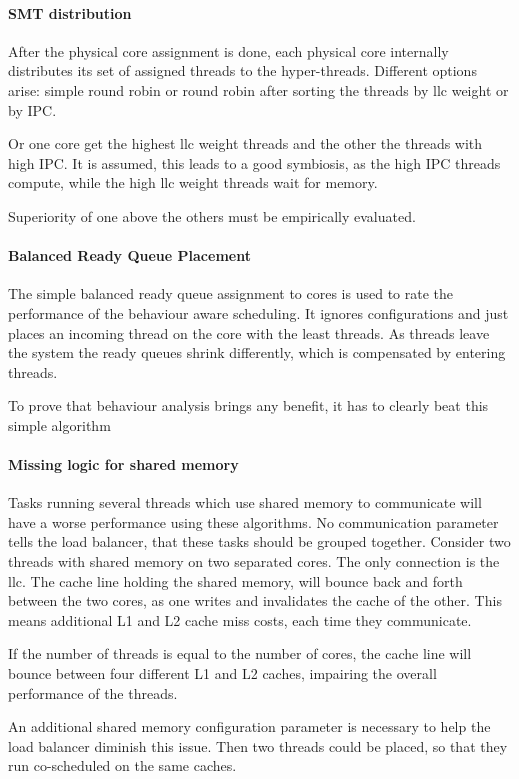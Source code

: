 \paragraph{SMT distribution}
After the physical core assignment is done, each physical core internally
distributes its set of assigned threads to the hyper-threads.
Different options arise: simple round robin or round robin after sorting the
threads by \gls{llc} weight or by IPC.

Or one core get the highest \gls{llc} weight threads and the other the threads
with high IPC.
It is assumed, this leads to a good symbiosis, as the high IPC threads compute,
while the high \gls{llc} weight threads wait for memory.

Superiority of one above the others must be empirically evaluated.


\paragraph{Balanced Ready Queue Placement}
The simple balanced ready queue assignment to cores is used to rate the
performance of the behaviour aware scheduling.
It ignores configurations and just places an incoming thread on the core with
the least threads.
As threads leave the system the ready queues shrink differently, which is
compensated by entering threads.

To prove that behaviour analysis brings any benefit, it has to clearly beat
this simple algorithm


\paragraph{Missing logic for shared memory}
Tasks running several threads which use shared memory to communicate will have
a worse performance using these algorithms.
No communication parameter tells the load balancer, that these tasks should be
grouped together.
Consider two threads with shared memory on two separated cores.
The only connection is the \gls{llc}.
The cache line holding the shared memory, will bounce back and forth between
the two cores, as one writes and invalidates the cache of the other.
This means additional L1 and L2 cache miss costs, each time they communicate.

If the number of threads is equal to the number of cores, the cache line will
bounce between four different L1 and L2 caches, impairing the overall
performance of the threads.

An additional shared memory configuration parameter is necessary to help the
load balancer diminish this issue.
Then two threads could be placed, so that they run co-scheduled on the same
caches.



